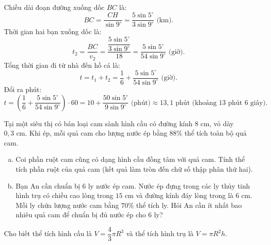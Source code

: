 \begin{bt}
{\begin{enumerate}[a)]
    Chiều dài đoạn đường xuống dốc $BC$ là:
    $$BC = \dfrac{CH}{\sin 9^\circ} = \dfrac{5\sin 5^\circ}{3\sin 9^\circ}\text{ (km)}.$$
    Thời gian hai bạn xuống dốc là:
    $$t_2 = \dfrac{BC}{v_2} = \dfrac{\dfrac{5\sin 5^\circ}{3\sin 9^\circ}}{18} = \dfrac{5\sin 5^\circ}{54\sin 9^\circ}\text{ (giờ)}.$$
    Tổng thời gian đi từ nhà đến hồ cá là:
    $$t = t_1 + t_2 = \dfrac{1}{6} + \dfrac{5\sin 5^\circ}{54\sin 9^\circ}\text{ (giờ)}.$$
    Đổi ra phút:
    $$t = \left(\dfrac{1}{6} + \dfrac{5\sin 5^\circ}{54\sin 9^\circ}\right) \cdot 60 = 10 + \dfrac{50\sin 5^\circ}{9\sin 9^\circ}\text{ (phút)} \approx 13{,}1\text{ phút (khoảng 13 phút 6 giây)}.$$
\end{enumerate}
}
\end{bt}

\begin{bt}%
Tại một siêu thị có bán loại cam sành hình cầu có đường kính $8\text{ cm}$, vỏ dày $0{,}3\text{ cm}$. Khi ép, mỗi quả cam cho lượng nước ép bằng $88\%$ thể tích toàn bộ quả cam.
\begin{enumerate}[a)]
    \item Coi phần ruột cam cũng có dạng hình cầu đồng tâm với quả cam. Tính thể tích phần ruột của quả cam (kết quả làm tròn đến chữ số thập phân thứ hai).
    \item Bạn An cần chuẩn bị $6$ ly nước ép cam. Nước ép đựng trong các ly thủy tinh hình trụ có chiều cao lòng trong $15\text{ cm}$ và đường kính đáy lòng trong là $6\text{ cm}$. Mỗi ly chứa lượng nước cam bằng $70\%$ thể tích ly. Hỏi An cần ít nhất bao nhiêu quả cam để chuẩn bị đủ nước ép cho $6$ ly?
\end{enumerate}
Cho biết thể tích hình cầu là $V = \dfrac{4}{3}\pi R^3$ và thể tích hình trụ là $V = \pi R^2 h$.
\end{bt}
